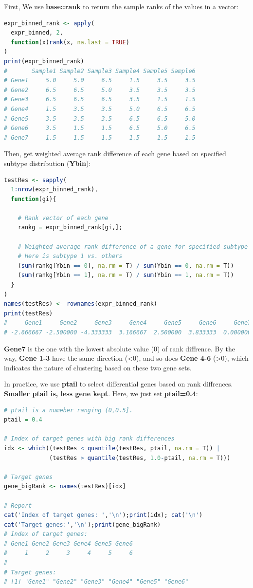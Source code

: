 \documentclass[
  12pt,
]{book}
\begin{document}
First, We use \textbf{base::rank} to return the sample ranks of the values in a vector:

\begin{lstlisting}[language=R]
expr_binned_rank <- apply(
  expr_binned, 2, 
  function(x)rank(x, na.last = TRUE)
)
print(expr_binned_rank)
#       Sample1 Sample2 Sample3 Sample4 Sample5 Sample6
# Gene1     5.0     5.0     6.5     1.5     3.5     3.5
# Gene2     6.5     6.5     5.0     3.5     3.5     3.5
# Gene3     6.5     6.5     6.5     3.5     1.5     1.5
# Gene4     1.5     3.5     3.5     5.0     6.5     6.5
# Gene5     3.5     3.5     3.5     6.5     6.5     5.0
# Gene6     3.5     1.5     1.5     6.5     5.0     6.5
# Gene7     1.5     1.5     1.5     1.5     1.5     1.5
\end{lstlisting}

Then, get weighted average rank difference of each gene based on specified subtype distribution (\textbf{Ybin}):

\begin{lstlisting}[language=R]
testRes <- sapply(
  1:nrow(expr_binned_rank), 
  function(gi){
    
    # Rank vector of each gene
    rankg = expr_binned_rank[gi,];
    
    # Weighted average rank difference of a gene for specified subtype 
    # Here is subtype 1 vs. others
    (sum(rankg[Ybin == 0], na.rm = T) / sum(Ybin == 0, na.rm = T)) - 
    (sum(rankg[Ybin == 1], na.rm = T) / sum(Ybin == 1, na.rm = T))
  }
)
names(testRes) <- rownames(expr_binned_rank)
print(testRes)
#     Gene1     Gene2     Gene3     Gene4     Gene5     Gene6     Gene7 
# -2.666667 -2.500000 -4.333333  3.166667  2.500000  3.833333  0.000000
\end{lstlisting}

\textbf{Gene7} is the one with the lowest absolute value (0) of rank diffrence. By the way, \textbf{Gene 1-3} have the same direction (\textless0), and so does \textbf{Gene 4-6} (\textgreater0), which indicates the nature of clustering based on these two gene sets.

In practice, we use \textbf{ptail} to select differential genes based on rank diffrences. \textbf{Smaller ptail is, less gene kept}. Here, we just set \textbf{ptail=0.4}:

\begin{lstlisting}[language=R]
# ptail is a numeber ranging (0,0.5].
ptail = 0.4

# Index of target genes with big rank differences
idx <- which((testRes < quantile(testRes, ptail, na.rm = T)) | 
             (testRes > quantile(testRes, 1.0-ptail, na.rm = T)))

# Target genes
gene_bigRank <- names(testRes)[idx]

# Report
cat('Index of target genes: ','\n');print(idx); cat('\n')
cat('Target genes:','\n');print(gene_bigRank)
# Index of target genes:  
# Gene1 Gene2 Gene3 Gene4 Gene5 Gene6 
#     1     2     3     4     5     6 
# 
# Target genes: 
# [1] "Gene1" "Gene2" "Gene3" "Gene4" "Gene5" "Gene6"
\end{lstlisting}
\end{document}
